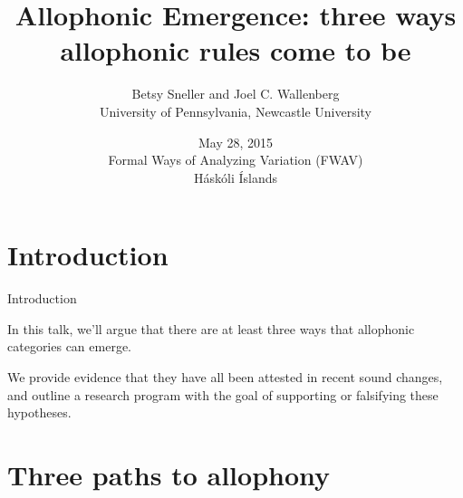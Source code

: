 \documentclass[hyperref={pdfpagelabels=false}]{beamer}
\title{Allophonic Emergence: three ways allophonic rules come to be}
\author{Betsy Sneller and Joel C. Wallenberg \\University of Pennsylvania, Newcastle University}
\institute{}
\date[]{May 28, 2015 \\ Formal Ways of Analyzing Variation (FWAV)\\ Háskóli Íslands}
\begin{document}
\begin{frame}[plain]
\titlepage
\end{frame}

\section{Introduction}
%
%			

\begin{frame}{Introduction}

In this talk, we'll argue that there are at least three ways that allophonic categories can emerge.

We provide evidence that they have all been attested in recent sound changes, and outline a research program with the goal of supporting or falsifying these hypotheses.

\end{frame}

\section[Outline]{}
\frame{\tableofcontents}

\section{Three paths to allophony}
\end{document}
